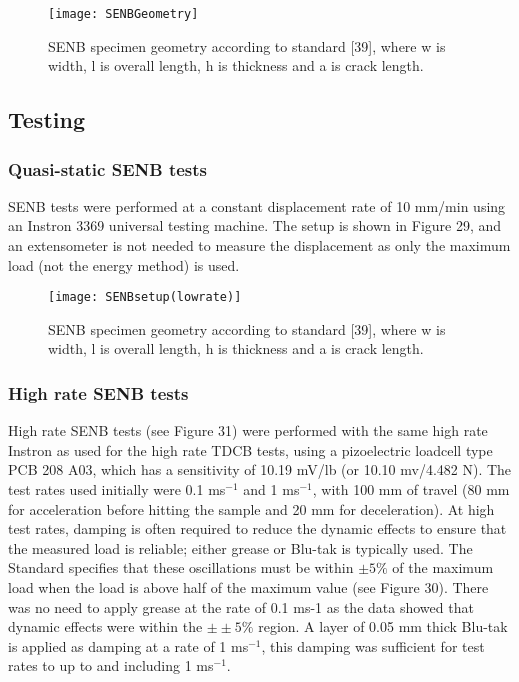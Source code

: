 \documentclass[numbers=noendperiod,chapterprefix=on]{icldt} %
\begin{document}
\begin{figure}[!hp]
\centering
\texttt{[image: SENBGeometry]}
\caption{SENB specimen geometry according to standard [39], where w is width, l is overall length, h is thickness and a is crack length.} %
\end{figure}

\subsection{Testing}
\subsubsection{Quasi-static SENB tests}
SENB tests were performed at a constant displacement rate of 10 mm/min using an Instron 3369 universal testing machine. The setup is shown in Figure 29, and an extensometer is not needed to measure the displacement as only the maximum load (not the energy method) is used.

\begin{figure}[!hp]
\centering
\texttt{[image: SENBsetup(lowrate)]}
\caption{SENB specimen geometry according to standard [39], where w is width, l is overall length, h is thickness and a is crack length.} %
\end{figure}


\subsubsection{High rate SENB tests}
High rate SENB tests (see Figure 31) were performed with the same high rate Instron as used for the high rate TDCB tests, using a pizoelectric loadcell type PCB 208 A03, which has a sensitivity of 10.19 mV/lb (or 10.10 mv/4.482 N).
The test rates used initially were 0.1 ms$^{-1}$ and 1 ms$^{-1}$, with 100 mm of travel (80 mm for acceleration before hitting the sample and 20 mm for deceleration). At high test rates, damping is often required to reduce the dynamic effects to ensure that the measured load is reliable; either grease or Blu-tak is typically used. The Standard specifies that these oscillations must be within $\pm5\%$ of the maximum load when the load is above half of the maximum value (see Figure 30). There was no need to apply grease at the rate of 0.1 ms-1 as the data showed that dynamic effects were within the $\pm±5\%$ region. A layer of 0.05 mm thick Blu-tak is applied as damping at a rate of 1 ms$^{-1}$, this damping was sufficient for test rates to up to and including 1 ms$^{-1}$.
\end{document}
